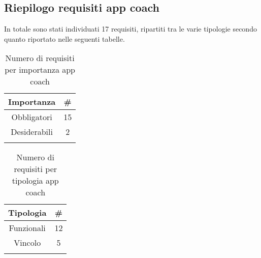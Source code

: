 \subsection{Riepilogo requisiti app coach}
In totale sono stati individuati 17 requisiti, ripartiti tra le varie tipologie secondo quanto riportato nelle seguenti tabelle.\\
\begin{center}
\begin{minipage}[c]{0.7\linewidth}
    \begin{small}
    \begin{longtable}{|c|c|}
    \hline
         \textbf{Importanza}& \# \\\hline
         Obbligatori & 15\\\hline
         Desiderabili & 2\\
         \hline
    \caption{Numero di requisiti per importanza app coach}
    \label{tab:requisiti-importanza-coach}
    \end{longtable}   
    \end{small}
\end{minipage}


\begin{minipage}[c]{0.7\linewidth}
    \begin{small}
    \begin{longtable}{|c|c|}
    \hline
         \textbf{Tipologia}& \# \\\hline
         Funzionali & 12\\\hline
         Vincolo & 5\\
         \hline
    \caption{Numero di requisiti per tipologia app coach}
    \label{tab:requisiti-tipolgia-coach}
    \end{longtable}   
    \end{small}
\end{minipage}
\end{center}